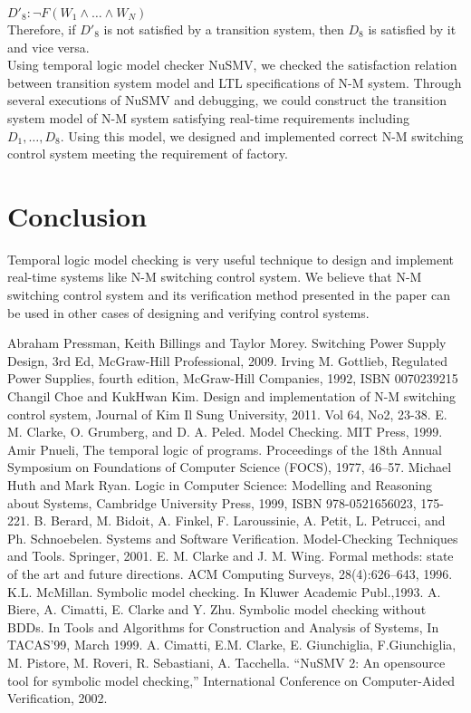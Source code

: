 \documentclass[runningheads,a4paper]{llncs}
\begin{document}
$D'_8: \neg F(W_1 \land \ldots \land W_N)$ \\

Therefore, if $D'_8$ is not satisfied by a transition system, then $D_8$ is satisfied by it and vice versa. \\

Using temporal logic model checker NuSMV, we checked the satisfaction relation between transition system model and LTL specifications of N-M system. Through several executions of NuSMV and debugging, we could construct the transition system model of N-M system satisfying real-time requirements including $D_1, \ldots, D_8$. Using this model, we designed and implemented correct N-M switching control system meeting the requirement of factory. 


\section{Conclusion}
Temporal logic model checking is very useful technique to design and implement real-time systems like N-M switching control system. We believe that N-M switching control system and its verification method presented in the paper can be used in other cases of designing and verifying control systems. 



\begin{thebibliography}{4}

	Abraham Pressman, Keith Billings and Taylor Morey. Switching Power Supply Design, 3rd Ed, McGraw-Hill Professional, 2009. 
	Irving M. Gottlieb, Regulated Power Supplies, fourth edition, McGraw-Hill Companies, 1992, ISBN 0070239215	Changil Choe and KukHwan Kim. Design and implementation of N-M switching control system, Journal of Kim Il Sung University, 2011. Vol 64, No2, 23-38.
	E. M. Clarke, O. Grumberg, and D. A. Peled. Model Checking. MIT Press, 1999.
	Amir Pnueli, The temporal logic of programs. Proceedings of the 18th Annual Symposium on Foundations of Computer Science (FOCS), 1977, 46–57.
	Michael Huth and Mark Ryan. Logic in Computer Science: Modelling and Reasoning about Systems, Cambridge University Press, 1999, ISBN 978-0521656023, 175-221.
	B. Berard, M. Bidoit, A. Finkel, F. Laroussinie, A. Petit, L. Petrucci, and Ph. Schnoebelen. Systems and Software Veriﬁcation. Model-Checking Techniques and Tools. Springer, 2001.
	E. M. Clarke and J. M. Wing. Formal methods: state of the art and future directions. ACM Computing Surveys, 28(4):626–643, 1996.
	K.L. McMillan. Symbolic model checking. In Kluwer Academic Publ.,1993.
	A. Biere, A. Cimatti, E. Clarke and Y. Zhu. Symbolic model checking without BDDs. In Tools and Algorithms for Construction and Analysis of Systems, In TACAS’99, March 1999. 
	A. Cimatti, E.M. Clarke, E. Giunchiglia, F.Giunchiglia, M. Pistore, M. Roveri, R. Sebastiani, A. Tacchella. “NuSMV 2: An opensource tool for symbolic model checking,” International Conference on Computer-Aided Verification, 2002.


\end{thebibliography}
\end{document}
